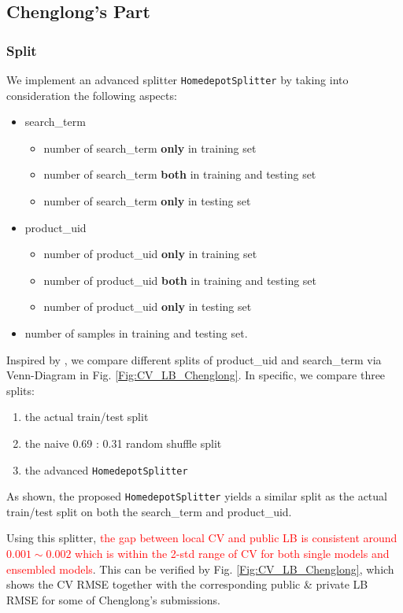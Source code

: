 \documentclass[12pt]{article}
\begin{document}
\subsection{Chenglong's Part}
\subsubsection{Split}
We implement an advanced splitter \texttt{HomedepotSplitter} by taking into consideration the following aspects:
\begin{itemize}
\item search\_term
\begin{itemize}
\item number of search\_term \textbf{only} in training set
\item number of search\_term \textbf{both} in training and testing set
\item number of search\_term \textbf{only} in testing set
\end{itemize}
\item product\_uid
\begin{itemize}
\item number of product\_uid \textbf{only} in training set
\item number of product\_uid \textbf{both} in training and testing set
\item number of product\_uid \textbf{only} in testing set
\end{itemize}
\item number of samples in training and testing set.
\end{itemize}

Inspired by \cite{BenS}, we compare different splits of product\_uid and search\_term via Venn-Diagram in Fig. \ref{Fig:CV_LB_Chenglong}. In specific, we compare three splits:
\begin{enumerate}
\item the actual train/test split
\item the naive 0.69 : 0.31 random shuffle split
\item the advanced \texttt{HomedepotSplitter}
\end{enumerate}
As shown, the proposed \texttt{HomedepotSplitter} yields a similar split as the actual train/test split on both the search\_term and product\_uid.

Using this splitter, \textcolor{red}{the gap between local CV and public LB is consistent around $0.001\sim 0.002$ which is within the 2-std range of CV for both single models and ensembled models}. This can be verified by Fig. \ref{Fig:CV_LB_Chenglong}, which shows the CV RMSE together with the corresponding public \& private LB RMSE for some of Chenglong's submissions.
\end{document}
